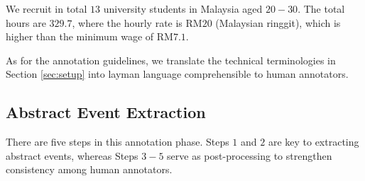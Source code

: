 
 
 

We recruit in total $13$ university students in Malaysia aged $20-30$. The total hours are  $329.7$, where the hourly rate is RM$20$ (Malaysian ringgit), which is higher than the minimum wage of RM$7.1$.  

As for the annotation guidelines, we translate the technical terminologies in Section \ref{sec:setup} into layman language comprehensible to human annotators.  


\subsection{Abstract Event Extraction}\label{sup:annotation_ph1}
There are five steps in this annotation phase. Steps $1$ and $2$ are key to extracting abstract events, whereas Steps $3-5$ serve as post-processing to strengthen consistency among human annotators. 

